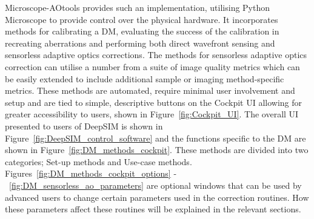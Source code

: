 Microscope-AOtools provides such an implementation, utilising Python Microscope to provide control over the physical hardware. It incorporates methods for calibrating a DM, evaluating the success of the calibration in recreating aberrations and performing both direct wavefront sensing and sensorless adaptive optics corrections. The methods for sensorless adaptive optics correction can utilise a number from a suite of image quality metrics which can be easily extended to include additional sample or imaging method-specific metrics. These methods are automated, require minimal user involvement and setup and are tied to simple, descriptive  buttons on the Cockpit UI allowing for greater accessibility to users, shown in Figure~\ref{fig:Cockpit_UI}. The overall UI presented to users of DeepSIM is shown in Figure~\ref{fig:DeepSIM_control_software} and the functions specific to the DM are shown in Figure~\ref{fig:DM_methods_cockpit}. These methods are divided into two categories; Set-up methods and Use-case methods. Figures~\ref{fig:DM_methods_cockpit_options} -~\ref{fig:DM_sensorless_ao_parameters} are optional windows that can be used by advanced users to change certain parameters used in the correction routines. How these parameters affect these routines will be explained in the relevant sections.

